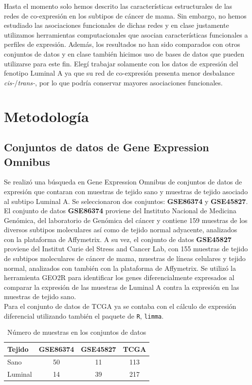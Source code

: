 \documentclass{article}
\begin{document}
Hasta el momento solo hemos descrito las características estructurales de las redes de co-expresión en los subtipos de cáncer de mama. Sin embargo, no hemos estudiado las asociaciones funcionales de dichas redes y en clase justamente utilizamos herramientas computacionales que asocian características funcionales a perfiles de expresión. Además, los resultados no han sido comparados con otros conjuntos de datos y en clase también hicimos uso de bases de datos que pueden utilizarse para este fin. Elegí trabajar solamente con los datos de expresión del fenotipo Luminal A ya que su red de co-expresión presenta menor desbalance \textit{cis-}/\textit{trans-}, por lo que podría conservar mayores asociaciones funcionales. 


\section*{Metodología}

\subsection*{Conjuntos de datos de Gene Expression Omnibus}
Se realizó una búsqueda en Gene Expression Omnibus de conjuntos de datos de expresión que contaran con muestras de tejido sano y muestras de tejido asociado al subtipo Luminal A. Se seleccionaron dos conjuntos: \textbf{GSE86374} y \textbf{GSE45827}. 
El conjunto de datos \textbf{GSE86374} \cite{GSE86374} proviene del Instituto Nacional de Medicina Genómica, del laboratorio de Genómica del cáncer y contiene 159 muestras de los diversos subtipos moleculares así como de tejido normal adyacente, analizados con la plataforma de Affymetrix. A su vez, el conjunto de datos \textbf{GSE45827}  \cite{GSE45827}  proviene del Institut Curie del Stress and Cancer Lab, con 155 muestras de tejido de subtipos moleculares de cáncer de mama, muestras de líneas celulares y tejido normal, analizados con también con la plataforma de Affymetrix. Se utilizó la herramienta GEO2R para identificar los genes diferencialmente expresados al comparar la expresión de las muestras de Luminal A contra la expresión en las muestras de tejido sano.\\
Para el conjunto de datos de TCGA ya se contaba con el cálculo de expresión diferencial utilizando también el paquete de \texttt{R}, \texttt{limma}. 

\begin{table}
\centering
\caption{
{Número de muestras en los conjuntos de datos}}
\begin{tabular}{|l|c|c|c|} 
\hline
 Tejido & \textbf{GSE86374} & \textbf{GSE45827} & \textbf{TCGA} \\
\hline
Sano & 50 & 11 & 113 \\
\hline
Luminal & 14 & 39 & 217 \\
\hline
\end{tabular}\\
\label{table:samples}
\end{table}
\end{document}

